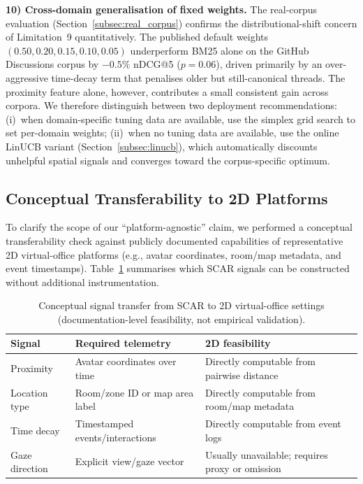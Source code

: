 \documentclass[journal]{IEEEtran}
\begin{document}
\textbf{10) Cross-domain generalisation of fixed weights.}
The real-corpus evaluation (Section~\ref{subsec:real_corpus}) confirms the
distributional-shift concern of Limitation~9 quantitatively. The published
default weights $(0.50, 0.20, 0.15, 0.10, 0.05)$ underperform BM25 alone on
the GitHub Discussions corpus by $-0.5\%$ nDCG@5 ($p = 0.06$), driven
primarily by an over-aggressive time-decay term that penalises older but
still-canonical threads. The proximity feature alone, however, contributes a
small consistent gain across corpora. We therefore distinguish between two
deployment recommendations: (i)~when domain-specific tuning data are
available, use the simplex grid search to set per-domain weights; (ii)~when
no tuning data are available, use the online LinUCB variant
(Section~\ref{subsec:linucb}), which automatically discounts unhelpful
spatial signals and converges toward the corpus-specific optimum.

\subsection{Conceptual Transferability to 2D Platforms}
\label{subsec:2d_transferability}

To clarify the scope of our ``platform-agnostic'' claim, we performed a
conceptual transferability check against publicly documented capabilities
of representative 2D virtual-office platforms (e.g., avatar coordinates,
room/map metadata, and event timestamps). Table~\ref{tab:2d_transfer}
summarises which SCAR signals can be constructed without additional
instrumentation.

\begin{table}[htbp]
\centering
\caption{Conceptual signal transfer from SCAR to 2D virtual-office settings (documentation-level feasibility, not empirical validation).}
\label{tab:2d_transfer}
\begin{tabular}{p{1.7cm}p{3.3cm}p{3.0cm}}
\hline
\textbf{Signal} & \textbf{Required telemetry} & \textbf{2D feasibility} \\
\hline
Proximity & Avatar coordinates over time & Directly computable from pairwise distance \\
Location type & Room/zone ID or map area label & Directly computable from room/map metadata \\
Time decay & Timestamped events/interactions & Directly computable from event logs \\
Gaze direction & Explicit view/gaze vector & Usually unavailable; requires proxy or omission \\
\hline
\end{tabular}
\end{table}
\end{document}
